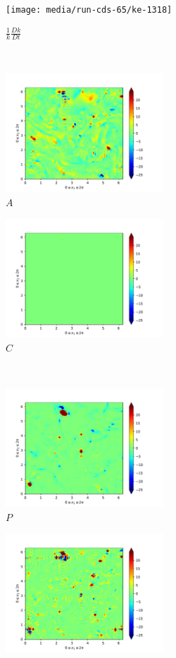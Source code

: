 \begin{figure}[H]
    \begin{subfigure}[H]{0.45\textwidth}
        \texttt{[image: media/run-cds-65/ke-1318]}
        \caption{$\frac{1}{k} \frac{D k}{Dt}$}
    \end{subfigure}
    ~
    \begin{subfigure}{0.45\textwidth}
        \includegraphics[height=1.75in]{media/run-cds-65/A-ke-1318}
        \caption{$A$}
    \end{subfigure}
    \newline
    \begin{subfigure}{0.45\textwidth}
        \includegraphics[height=1.75in]{media/run-cds-65/C-ke-1318}
        \caption{$C$}
    \end{subfigure}
    ~
    \begin{subfigure}{0.45\textwidth}
        \includegraphics[height=1.75in]{media/run-cds-65/P-ke-1318}
        \caption{$P$}
    \end{subfigure}
    \newline
    \begin{subfigure}{0.45\textwidth}
        \includegraphics[height=1.75in]{media/run-cds-65/B-ke-1318}

\end{subfigure}
\end{figure}
